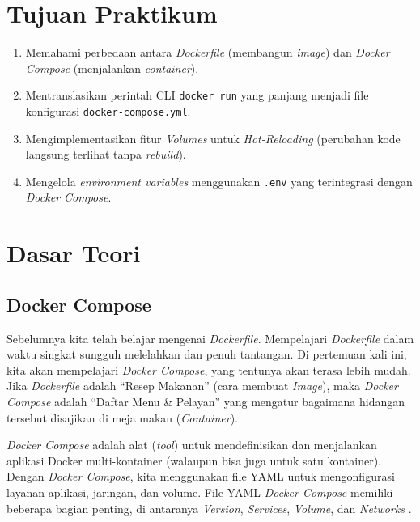 \documentclass[a4paper,oneside,12pt]{report}
\begin{document}
\setcounter{page}{1}

\chapter[Tujuan Praktikum]{Tujuan Praktikum}
\begin{enumerate}
    \item Memahami perbedaan antara \textit{Dockerfile} (membangun \textit{image}) dan \textit{Docker Compose} (menjalankan \textit{container}).
    \item Mentranslasikan perintah CLI \texttt{docker run} yang panjang menjadi file konfigurasi \texttt{docker-compose.yml}.
    \item Mengimplementasikan fitur \textit{Volumes} untuk \textit{Hot-Reloading} (perubahan kode langsung terlihat tanpa \textit{rebuild}).
    \item Mengelola \textit{environment variables} menggunakan \texttt{.env} yang terintegrasi dengan \textit{Docker Compose}.
\end{enumerate}
\clearpage

\chapter{Dasar Teori}

\section{Docker Compose}
Sebelumnya kita telah belajar mengenai \textit{Dockerfile}. Mempelajari \textit{Dockerfile} dalam waktu singkat sungguh melelahkan dan penuh tantangan. Di pertemuan kali ini, kita akan mempelajari \textit{Docker Compose}, yang tentunya akan terasa lebih mudah. Jika \textit{Dockerfile} adalah ``Resep Makanan'' (cara membuat \textit{Image}), maka \textit{Docker Compose} adalah ``Daftar Menu \& Pelayan'' yang mengatur bagaimana hidangan tersebut disajikan di meja makan (\textit{Container}).

\textit{Docker Compose} adalah alat (\textit{tool}) untuk mendefinisikan dan menjalankan aplikasi Docker multi-kontainer (walaupun bisa juga untuk satu kontainer). Dengan \textit{Docker Compose}, kita menggunakan file YAML untuk mengonfigurasi layanan aplikasi, jaringan, dan volume. File YAML \textit{Docker Compose} memiliki beberapa bagian penting, di antaranya \textit{Version}, \textit{Services}, \textit{Volume}, dan \textit{Networks} \cite{docker_docs}.
\end{document}

